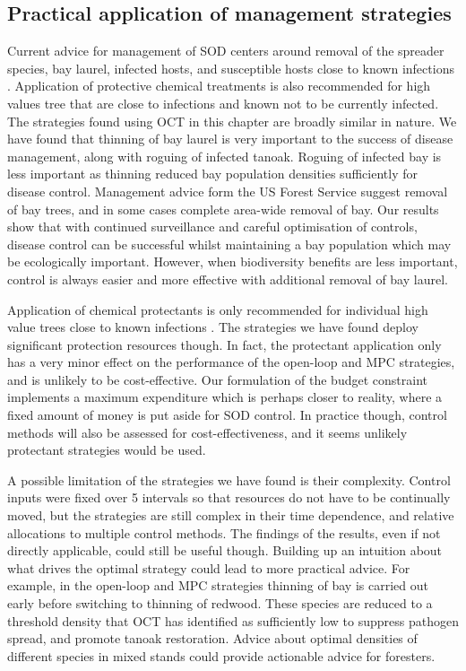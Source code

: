 \subsection{Practical application of management strategies}

Current advice for management of SOD centers around removal of the spreader species, bay laurel, infected hosts, and susceptible hosts close to known infections \citep{comtf_sudden_2014}. Application of protective chemical treatments is also recommended for high values tree that are close to infections and known not to be currently infected. The strategies found using OCT in this chapter are broadly similar in nature. We have found that thinning of bay laurel is very important to the success of disease management, along with roguing of infected tanoak. Roguing of infected bay is less important as thinning reduced bay population densities sufficiently for disease control. Management advice form the US Forest Service \citep{swiecki_reference_2013} suggest removal of bay trees, and in some cases complete area-wide removal of bay. Our results show that with continued surveillance and careful optimisation of controls, disease control can be successful whilst maintaining a bay population which may be ecologically important. However, when biodiversity benefits are less important, control is always easier and more effective with additional removal of bay laurel.

Application of chemical protectants is only recommended for individual high value trees close to known infections \citep{comtf_sudden_2014}. The strategies we have found deploy significant protection resources though. In fact, the protectant application only has a very minor effect on the performance of the open-loop and MPC strategies, and is unlikely to be cost-effective. Our formulation of the budget constraint implements a maximum expenditure which is perhaps closer to reality, where a fixed amount of money is put aside for SOD control. In practice though, control methods will also be assessed for cost-effectiveness, and it seems unlikely protectant strategies would be used.

A possible limitation of the strategies we have found is their complexity. Control inputs were fixed over \SI{5}{\year} intervals so that resources do not have to be continually moved, but the strategies are still complex in their time dependence, and relative allocations to multiple control methods. The findings of the results, even if not directly applicable, could still be useful though. Building up an intuition about what drives the optimal strategy could lead to more practical advice. For example, in the open-loop and MPC strategies thinning of bay is carried out early before switching to thinning of redwood. These species are reduced to a threshold density that OCT has identified as sufficiently low to suppress pathogen spread, and promote tanoak restoration. Advice about optimal densities of different species in mixed stands could provide actionable advice for foresters.

